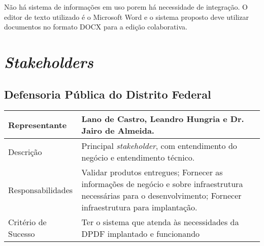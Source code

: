 \documentclass[12pt,a4paper]{report}
\begin{document}
Não há sistema de informações em uso porem há necessidade de integração. O editor de texto utilizado é o Microsoft Word e o sistema proposto deve utilizar documentos no formato DOCX para a edição colaborativa.

\section{\textit{Stakeholders}}

\subsection{Defensoria Pública do Distrito Federal}

\begin{center}
\begin{tabular}{ | l | p{10cm} | }
\hline
Representante          & Lano de Castro, Leandro Hungria e Dr. Jairo de Almeida. \\
\hline
Descrição              & Principal \textit{stakeholder}, com entendimento do negócio e entendimento técnico.\\
\hline
Responsabilidades      & Validar produtos entregues; Fornecer as informações de negócio e sobre infraestrutura necessárias para o desenvolvimento; Fornecer infraestrutura para implantação.\\
\hline
Critério de Sucesso    & Ter o sistema que atenda às necessidades da DPDF implantado e funcionando\\
\hline
\end{tabular}
\end{center}
\end{document}
